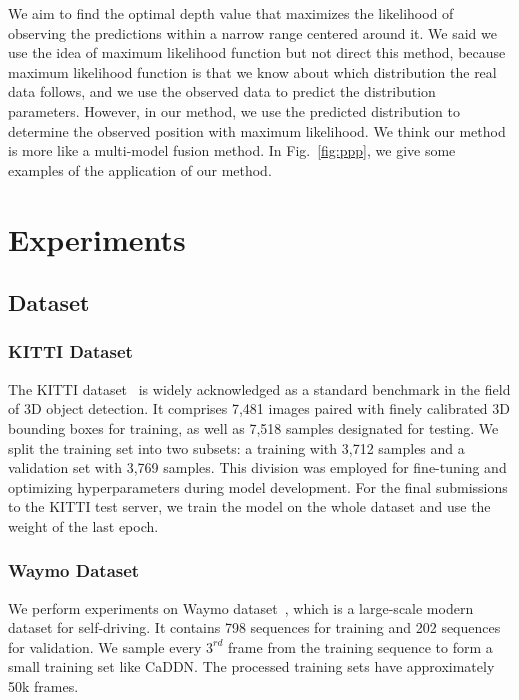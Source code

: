 \documentclass[journal]{IEEEtran}
\begin{document}
		We aim to find the optimal depth value that maximizes the likelihood of observing the predictions within a narrow range centered around it. We said we use the idea of maximum likelihood function but not direct this method, because maximum likelihood function is that we know about which distribution the real data follows, and we use the observed data to predict the distribution parameters. However, in our method, we use the predicted distribution to determine the observed position with maximum likelihood. We think our method is more like a multi-model fusion method. In Fig.~\ref{fig:ppp}, we give some examples of the application of our method.
		
		
	
	
	
	\section{Experiments}\label{sec:exp}
	\subsection{Dataset}
	\subsubsection{KITTI Dataset}
	The KITTI dataset~\cite{kitti} is widely acknowledged as a standard benchmark in the field of 3D object detection. It comprises 7,481 images paired with finely calibrated 3D bounding boxes for training, as well as 7,518 samples designated for testing. We split the training set into two subsets: a training with 3,712 samples and a validation set with 3,769 samples. This division was employed for fine-tuning and optimizing hyperparameters during model development. For the final submissions to the KITTI test server, we train the model on the whole dataset and use the weight of the last epoch.
	
	\subsubsection{Waymo Dataset}
	We perform experiments on Waymo dataset~\cite{waymo}, which is a large-scale modern dataset for self-driving. It contains 798 sequences for training and 202 sequences for validation. We sample every $3^{rd}$ frame from the training sequence to form a small training set like CaDDN. The processed training sets have approximately 50k frames.
	
\end{document}
